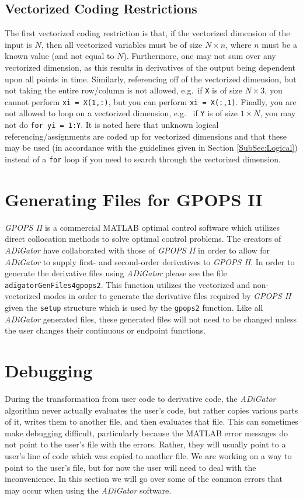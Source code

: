 \documentclass[10pt,pdftex]{article}
\begin{document}
\subsection{Vectorized Coding Restrictions}
The first vectorized coding restriction is that, if the vectorized dimension of the input is $N$, then all vectorized variables must be of size $N \times n$, where $n$ must be a known value (and not equal to $N$). Furthermore, one may not sum over any vectorized dimension, as this results in derivatives of the output being dependent upon all points in time. Similarly, referencing off of the vectorized dimension, but not taking the entire row/column is not allowed, e.g.~if \texttt{X} is of size $N \times 3$, you cannot perform \texttt{xi = X(1,:)}, but you can perform \texttt{xi = X(:,1)}. Finally, you are not allowed to loop on a vectorized dimension, e.g.~ if \texttt{Y} is of size $1 \times N$, you may not do \texttt{for yi = 1:Y}. It is noted here that unknown logical referencing/assignments are coded up for vectorized dimensions and that these may be used (in accordance with the guidelines given in Section \ref{SubSec:Logical}) instead of a \texttt{for} loop if you need to search through the vectorized dimension.

\section{Generating Files for GPOPS II}
{\em GPOPS II} is a commercial MATLAB optimal control software which utilizes direct collocation methods to solve optimal control problems.
The creators of {\em ADiGator} have collaborated with those of {\em GPOPS II} in order to allow for {\em ADiGator} to supply first- and second-order derivatives to {\em GPOPS II}.
In order to generate the derivative files using {\em ADiGator} please see the file \texttt{adigatorGenFiles4gpops2}.
This function utilizes the vectorized and non-vectorized modes in order to generate the derivative files required by {\em GPOPS II} given the \texttt{setup} structure which is used by the \texttt{gpops2} function.
Like all {\em ADiGator} generated files, these generated files will not need to be changed unless the user changes their continuous or endpoint functions.

\section{Debugging}
During the transformation from user code to derivative code, the \emph{ADiGator} algorithm never actually evaluates the user's code, but rather copies various parts of it, writes them to another file, and then evaluates that file. This can sometimes make debugging difficult, particularly because the MATLAB error messages do not point to the user's file with the errors. Rather, they will usually point to a user's line of code which was copied to another file. We are working on a way to point to the user's file, but for now the user will need to deal with the inconvenience.
In this section we will go over some of the common errors that may occur when using the \emph{ADiGator} software.
\end{document}
